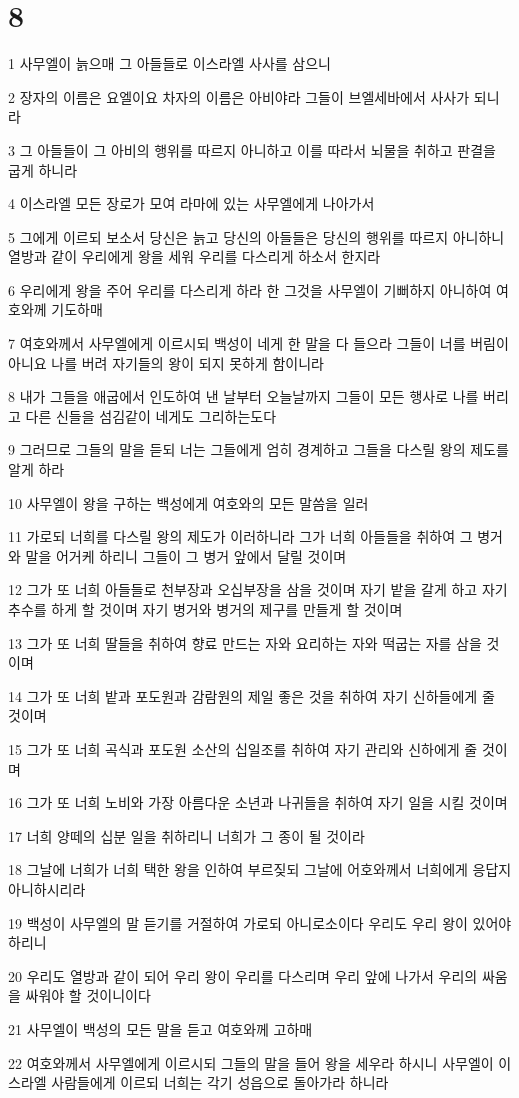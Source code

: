 \chapter{8}

\par 1 사무엘이 늙으매 그 아들들로 이스라엘 사사를 삼으니
\par 2 장자의 이름은 요엘이요 차자의 이름은 아비야라 그들이 브엘세바에서 사사가 되니라
\par 3 그 아들들이 그 아비의 행위를 따르지 아니하고 이를 따라서 뇌물을 취하고 판결을 굽게 하니라
\par 4 이스라엘 모든 장로가 모여 라마에 있는 사무엘에게 나아가서
\par 5 그에게 이르되 보소서 당신은 늙고 당신의 아들들은 당신의 행위를 따르지 아니하니 열방과 같이 우리에게 왕을 세워 우리를 다스리게 하소서 한지라
\par 6 우리에게 왕을 주어 우리를 다스리게 하라 한 그것을 사무엘이 기뻐하지 아니하여 여호와께 기도하매
\par 7 여호와께서 사무엘에게 이르시되 백성이 네게 한 말을 다 들으라 그들이 너를 버림이 아니요 나를 버려 자기들의 왕이 되지 못하게 함이니라
\par 8 내가 그들을 애굽에서 인도하여 낸 날부터 오늘날까지 그들이 모든 행사로 나를 버리고 다른 신들을 섬김같이 네게도 그리하는도다
\par 9 그러므로 그들의 말을 듣되 너는 그들에게 엄히 경계하고 그들을 다스릴 왕의 제도를 알게 하라
\par 10 사무엘이 왕을 구하는 백성에게 여호와의 모든 말씀을 일러
\par 11 가로되 너희를 다스릴 왕의 제도가 이러하니라 그가 너희 아들들을 취하여 그 병거와 말을 어거케 하리니 그들이 그 병거 앞에서 달릴 것이며
\par 12 그가 또 너희 아들들로 천부장과 오십부장을 삼을 것이며 자기 밭을 갈게 하고 자기 추수를 하게 할 것이며 자기 병거와 병거의 제구를 만들게 할 것이며
\par 13 그가 또 너희 딸들을 취하여 향료 만드는 자와 요리하는 자와 떡굽는 자를 삼을 것이며
\par 14 그가 또 너희 밭과 포도원과 감람원의 제일 좋은 것을 취하여 자기 신하들에게 줄 것이며
\par 15 그가 또 너희 곡식과 포도원 소산의 십일조를 취하여 자기 관리와 신하에게 줄 것이며
\par 16 그가 또 너희 노비와 가장 아름다운 소년과 나귀들을 취하여 자기 일을 시킬 것이며
\par 17 너희 양떼의 십분 일을 취하리니 너희가 그 종이 될 것이라
\par 18 그날에 너희가 너희 택한 왕을 인하여 부르짖되 그날에 어호와께서 너희에게 응답지 아니하시리라
\par 19 백성이 사무엘의 말 듣기를 거절하여 가로되 아니로소이다 우리도 우리 왕이 있어야 하리니
\par 20 우리도 열방과 같이 되어 우리 왕이 우리를 다스리며 우리 앞에 나가서 우리의 싸움을 싸워야 할 것이니이다
\par 21 사무엘이 백성의 모든 말을 듣고 여호와께 고하매
\par 22 여호와께서 사무엘에게 이르시되 그들의 말을 들어 왕을 세우라 하시니 사무엘이 이스라엘 사람들에게 이르되 너희는 각기 성읍으로 돌아가라 하니라


